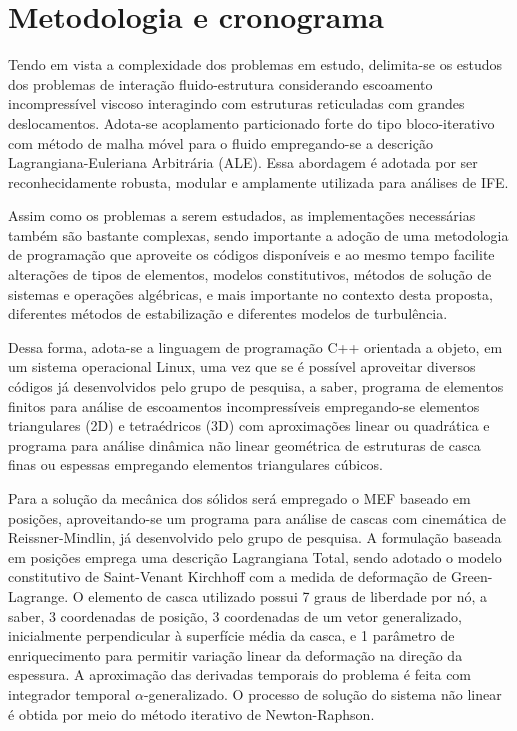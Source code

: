 \chapter{Metodologia e cronograma} \label{MetodologiaCronograma}

Tendo em vista a complexidade dos problemas em estudo, delimita-se os estudos dos problemas de interação fluido-estrutura considerando escoamento incompressível viscoso interagindo com estruturas reticuladas com grandes deslocamentos. Adota-se acoplamento particionado forte do tipo bloco-iterativo com método de malha móvel para o fluido empregando-se a descrição Lagrangiana-Euleriana Arbitrária (ALE). Essa abordagem é adotada por ser reconhecidamente robusta, modular e amplamente utilizada para análises de IFE.

Assim como os problemas a serem estudados, as implementações necessárias também são bastante complexas, sendo importante a adoção de uma metodologia de programação que aproveite os códigos disponíveis e ao mesmo tempo facilite alterações de tipos de elementos, modelos constitutivos, métodos de solução de sistemas e operações algébricas, e mais importante no contexto desta proposta, diferentes métodos de estabilização e diferentes modelos de turbulência.

Dessa forma, adota-se a linguagem de programação C++ orientada a objeto, em um sistema operacional Linux, uma vez que se é possível aproveitar diversos códigos já desenvolvidos pelo grupo de pesquisa, a saber, programa de elementos finitos para análise de escoamentos incompressíveis empregando-se elementos triangulares (2D) e tetraédricos (3D) com aproximações linear ou quadrática e programa para análise dinâmica não linear geométrica de estruturas de casca finas ou espessas empregando elementos triangulares cúbicos.

Para a solução da mecânica dos sólidos será empregado o MEF baseado em posições, aproveitando-se um programa para análise de cascas com cinemática de Reissner-Mindlin, já desenvolvido pelo grupo de pesquisa. A formulação baseada em posições emprega uma descrição Lagrangiana Total, sendo adotado o modelo constitutivo de Saint-Venant Kirchhoff  com a medida de deformação de Green-Lagrange. O elemento de casca utilizado possui 7 graus de liberdade por nó, a saber, 3 coordenadas de posição, 3 coordenadas de um vetor generalizado, inicialmente perpendicular à superfície média da casca, e 1 parâmetro de enriquecimento para permitir variação linear da deformação na direção da espessura. A aproximação das derivadas temporais do problema é feita com integrador temporal $\alpha$-generalizado. O processo de solução do sistema não linear é obtida por meio do método iterativo de Newton-Raphson.

